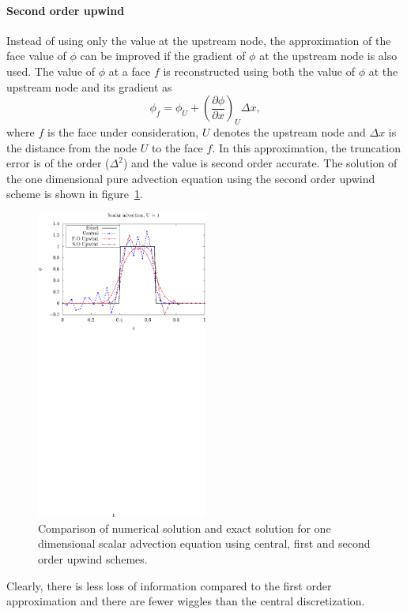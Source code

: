 \paragraph{Second order upwind}
Instead of using only the value at the upstream node, the approximation of the face value of $\phi$ can be improved if the gradient of $\phi$ at the upstream node is also used. The value of $\phi$ at a face $f$ is reconstructed using both the value of $\phi$ at the upstream node and its gradient as
\begin{equation*}
\phi_f = \phi_U + \left(\frac{\partial \phi}{\partial x}\right)_U\Delta x,
\end{equation*}
where $f$ is the face under consideration, $U$ denotes the upstream node and $\Delta x$ is the distance from the node $U$ to the face $f$. In this approximation, the truncation error is of the order ($\Delta^2$) and the value is second order accurate. The solution of the one dimensional pure advection equation using the second order upwind scheme is shown in figure~\ref{fig:upwcen2ord}.
\begin{figure}[h]
\centering
\captionsetup{justification=centering}
 \includegraphics[trim=0 395 0 0,clip, width=0.5\textwidth]{ch2_litsurvey/Figures/box_cen_foso.eps}
\caption{Comparison of numerical solution and exact solution for one dimensional scalar advection equation using central, first and second order upwind schemes.}
 \label{fig:upwcen2ord}
\end{figure}
Clearly, there is less loss of information compared to the first order approximation and there are fewer wiggles than the central discretization.

